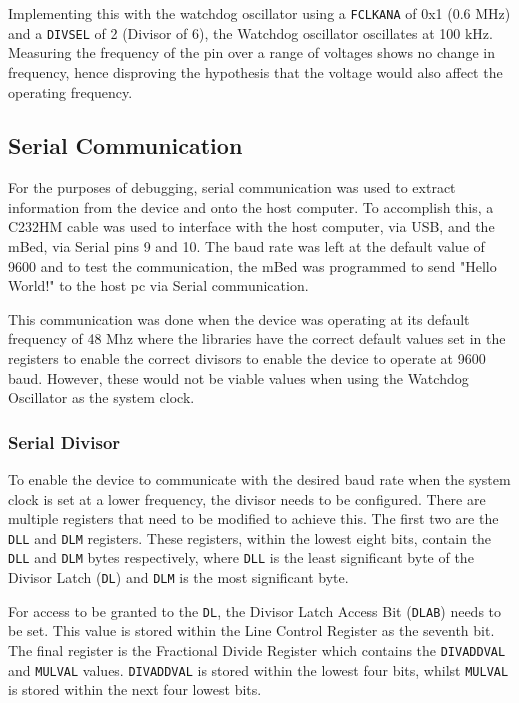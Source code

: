 Implementing this with the watchdog oscillator using a \verb|FCLKANA| of 0x1 (0.6 MHz) and a \verb|DIVSEL| of 2 (Divisor of 6), the Watchdog oscillator oscillates at 100 kHz. Measuring the frequency of the pin over a range of voltages shows no change in frequency, hence disproving the hypothesis that the voltage would also affect the operating frequency.

\subsection{Serial Communication}

For the purposes of debugging, serial communication was used to extract information from the device and onto the host computer. To accomplish this, a C232HM cable \cite{c232hm_datasheet} was used to interface with the host computer, via USB, and the mBed, via Serial pins 9 and 10. The baud rate was left at the default value of 9600 and to test the communication, the mBed was programmed to send "Hello World!" to the host pc via Serial communication.

This communication was done when the device was operating at its default frequency of 48 Mhz where the libraries have the correct default values set in the registers to enable the correct divisors to enable the device to operate at 9600 baud. However, these would not be viable values when using the Watchdog Oscillator as the system clock.

\subsubsection{Serial Divisor}

To enable the device to communicate with the desired baud rate when the system clock is set at a lower frequency, the divisor needs to be configured. There are multiple registers that need to be modified to achieve this. The first two are the \verb|DLL| and \verb|DLM| registers. These registers, within the lowest eight bits, contain the \verb|DLL| and \verb|DLM| bytes respectively, where \verb|DLL| is the least significant byte of the Divisor Latch (\verb|DL|) and \verb|DLM| is the most significant byte.

For access to be granted to the \verb|DL|, the Divisor Latch Access Bit (\verb|DLAB|) needs to be set. This value is stored within the Line Control Register as the seventh bit. The final register is the Fractional Divide Register which contains the \verb|DIVADDVAL| and \verb|MULVAL| values. \verb|DIVADDVAL| is stored within the lowest four bits, whilst \verb|MULVAL| is stored within the next four lowest bits. 

